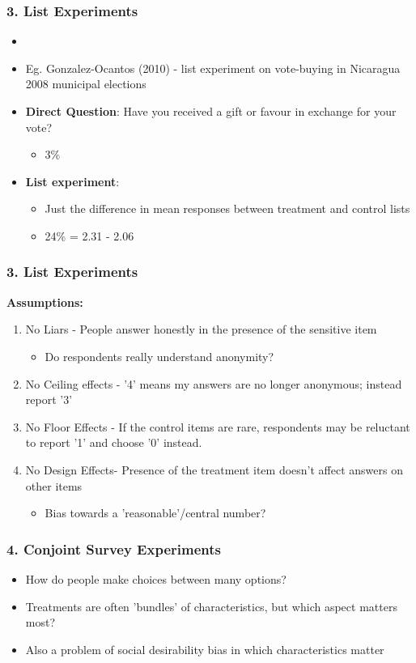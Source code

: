 \documentclass[xcolor=x11names,compress]{beamer}\usepackage[]{graphicx}\usepackage[]{color}
\renewcommand{\(}{\begin{columns}}
\renewcommand{\)}{\end{columns}}
\newcommand{\<}[1]{\begin{column}{#1}}
\renewcommand{\>}{\end{column}}
\begin{document}
\begin{frame}
\frametitle{3. List Experiments}
\begin{itemize}
\item \item Eg. Gonzalez-Ocantos (2010) - list experiment on vote-buying in Nicaragua 2008 municipal elections
\item \textbf{Direct Question}: Have you received a gift or favour in exchange for your vote?
\begin{itemize}
\item 3\%
\pause
\end{itemize}
\item \textbf{List experiment}:
\begin{itemize}
\item Just the difference in mean responses between treatment and control lists
\item 24\% = 2.31 - 2.06
\end{itemize}
\end{itemize}
\end{frame}

\begin{frame}
\frametitle{3. List Experiments}
\textbf{Assumptions:}
\begin{enumerate}
\item No Liars - People answer honestly in the presence of the sensitive item
\pause
\begin{itemize}
\item Do respondents really understand anonymity?
\end{itemize}
\pause
\item No Ceiling effects - '4' means my answers are no longer anonymous; instead report '3'
\pause
\item No Floor Effects - If the control items are rare, respondents may be reluctant to report '1' and choose '0' instead.
\pause
\item No Design Effects- Presence of the treatment item doesn't affect answers on other items
\begin{itemize}
\item Bias towards a 'reasonable'/central number?
\end{itemize}
\end{enumerate}
\end{frame}

\begin{frame}
\frametitle{4. Conjoint Survey Experiments}
\begin{itemize}
\item How do people make choices between many options?
\pause
\item Treatments are often 'bundles' of characteristics, but which aspect matters most?
\pause
\item Also a problem of social desirability bias in which characteristics matter
\end{itemize}
\end{frame}
\end{document}
